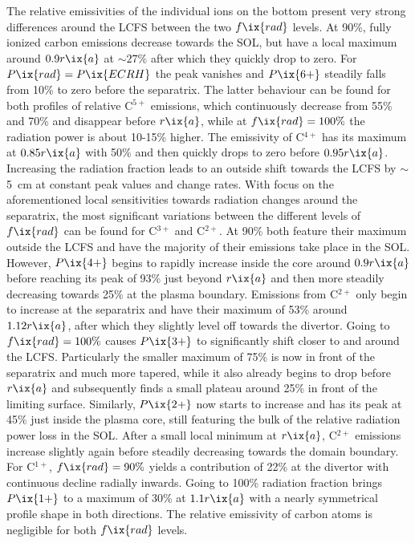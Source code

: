         The relative emissivities of the individual ions on the bottom present very strong differences around the LCFS between the two $f\ix{rad}$ levels. At 90\%, fully ionized carbon emissions decrease towards the SOL, but have a local maximum around $0.9r\ix{a}$ at $\sim27\%$ after which they quickly drop to zero. For $P\ix{rad}=P\ix{ECRH}$ the peak vanishes and $P\ix{6+}$ steadily falls from 10\% to zero before the separatrix. The latter behaviour can be found for both profiles of relative C$^{5+}$ emissions, which continuously decrease from 55\% and 70\% and disappear before $r\ix{a}$, while at $f\ix{rad}=100\%$ the radiation power is about 10-15\% higher. The emissivity of C$^{4+}$ has its maximum at $0.85r\ix{a}$ with 50\% and then quickly drops to zero before $0.95r\ix{a}$. Increasing the radiation fraction leads to an outside shift towards the LCFS by $\sim$\SI{5}{\centi\meter} at constant peak values and change rates. With focus on the aforementioned local sensitivities towards radiation changes around the separatrix, the most significant variations between the different levels of $f\ix{rad}$ can be found for C$^{3+}$ and C$^{2+}$. At 90\% both feature their maximum outside the LCFS and have the majority of their emissions take place in the SOL. However, $P\ix{4+}$ begins to rapidly increase inside the core around $0.9r\ix{a}$ before reaching its peak of 93\% just beyond $r\ix{a}$ and then more steadily decreasing towards 25\% at the plasma boundary. Emissions from C$^{2+}$ only begin to increase at the separatrix and have their maximum of 53\% around $1.12r\ix{a}$, after which they slightly level off towards the divertor. Going to $f\ix{rad}=100\%$ causes $P\ix{3+}$ to significantly shift closer to and around the LCFS. Particularly the smaller maximum of 75\% is now in front of the separatrix and much more tapered, while it also already begins to drop before $r\ix{a}$ and subsequently finds a small plateau around 25\% in front of the limiting surface. Similarly, $P\ix{2+}$ now starts to increase and has its peak at 45\% just inside the plasma core, still featuring the bulk of the relative radiation power loss in the SOL. After a small local minimum at $r\ix{a}$, C$^{2+}$ emissions increase slightly again before steadily decreasing towards the domain boundary. For C$^{1+}$, $f\ix{rad}=90\%$ yields a contribution of 22\% at the divertor with continuous decline radially inwards. Going to 100\% radiation fraction brings $P\ix{1+}$ to a maximum of 30\% at $1.1r\ix{a}$ with a nearly symmetrical profile shape in both directions. The relative emissivity of carbon atoms is negligible for both $f\ix{rad}$ levels.\\%

